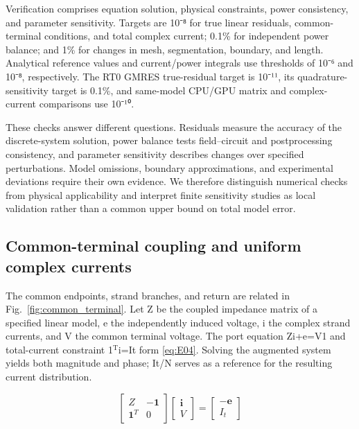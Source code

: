 \hypertarget{02.hierarchy.p2}{}
Verification comprises equation solution, physical constraints, power consistency, and parameter sensitivity. Targets are 10⁻⁸ for true linear residuals, common-terminal conditions, and total complex current; 0.1\% for independent power balance; and 1\% for changes in mesh, segmentation, boundary, and length. Analytical reference values and current/power integrals use thresholds of 10⁻⁶ and 10⁻⁸, respectively. The RT0 GMRES true-residual target is 10⁻¹¹, its quadrature-sensitivity target is 0.1\%, and same-model CPU/GPU matrix and complex-current comparisons use 10⁻¹⁰.

\hypertarget{02.hierarchy.p3}{}
These checks answer different questions. Residuals measure the accuracy of the discrete-system solution, power balance tests field–circuit and postprocessing consistency, and parameter sensitivity describes changes over specified perturbations. Model omissions, boundary approximations, and experimental deviations require their own evidence. We therefore distinguish numerical checks from physical applicability and interpret finite sensitivity studies as local validation rather than a common upper bound on total model error.

\hypertarget{02.common.heading}{}
\subsection{Common-terminal coupling and uniform complex currents}

\hypertarget{02.common.p1}{}
The common endpoints, strand branches, and return are related in Fig.~\ref{fig:common_terminal}. Let Z be the coupled impedance matrix of a specified linear model, e the independently induced voltage, i the complex strand currents, and V the common terminal voltage. The port equation Zi+e=V1 and total-current constraint 1\(^{\mathrm T}\)i=It form \eqref{eq:E04}. Solving the augmented system yields both magnitude and phase; It/N serves as a reference for the resulting current distribution.

\hypertarget{02.equation.E04}{}
\hypertarget{E04}{}\begin{equation}\begin{bmatrix} Z&-\mathbf1\\ \mathbf1^T&0\end{bmatrix}\begin{bmatrix}\mathbf i\\V\end{bmatrix}=\begin{bmatrix}-\mathbf e\\I_t\end{bmatrix}\tag{3}\label{eq:E04}\end{equation}

